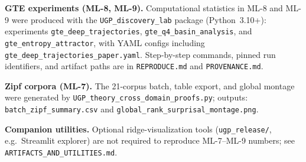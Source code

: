 \documentclass[11pt]{article}
\begin{document}
\begin{sloppypar}
\noindent\textbf{GTE experiments (ML-8, ML-9).} Computational statistics in ML-8 and ML-9 were produced with the \texttt{UGP\_discovery\_lab} package (Python~3.10+): experiments \texttt{gte\_deep\_trajectories}, \texttt{gte\_q4\_basin\_analysis}, and \texttt{gte\_entropy\_attractor}, with YAML configs including \texttt{gte\_deep\_trajectories\_paper.yaml}. Step-by-step commands, pinned run identifiers, and artifact paths are in \texttt{REPRODUCE.md} and \texttt{PROVENANCE.md}.

\noindent\textbf{Zipf corpora (ML-7).} The 21-corpus batch, table export, and global montage were generated by \texttt{UGP\_theory\_cross\_domain\_proofs.py}; outputs: \texttt{batch\_zipf\_summary.csv} and \texttt{global\_rank\_surprisal\_montage.png}.
\end{sloppypar}

\noindent\textbf{Companion utilities.} Optional ridge-visualization tools (\texttt{ugp\_release/}, e.g.\ Streamlit explorer) are not required to reproduce ML-7--ML-9 numbers; see \texttt{ARTIFACTS\_AND\_UTILITIES.md}.

\appendix
\end{document}
